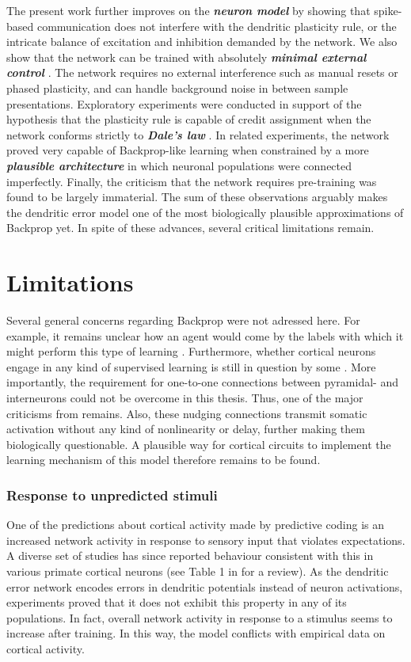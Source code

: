 The present work further improves on the \textit{\textbf{neuron model}} by showing that spike-based communication does
not interfere with the dendritic plasticity rule, or the intricate balance of excitation and inhibition demanded by the
network. We also show that the network can be trained with absolutely \textit{\textbf{minimal external control}}
\citep{Whittington2017}. The network requires no external interference such as manual resets or phased plasticity, and
can handle background noise in between sample presentations. Exploratory experiments were conducted in support of the
hypothesis that the plasticity rule is capable of credit assignment when the network conforms strictly to
\textit{\textbf{Dale's law}} \citep{Bartunov2018}. In related experiments, the network proved very capable of
Backprop-like learning when constrained by a more \textit{\textbf{plausible architecture}} \citep{Whittington2017} in
which neuronal populations were connected imperfectly. Finally, the criticism that the network requires pre-training
\citep{whittington2019theories} was found to be largely immaterial. The sum of these observations arguably makes the
dendritic error model one of the most biologically plausible approximations of Backprop yet. In spite of these advances,
several critical limitations remain.


\section{Limitations}

Several general concerns regarding Backprop were not adressed here. For example, it remains unclear how an agent would
come by the labels with which it might perform this type of learning \citep{Bengio2015}. Furthermore, whether cortical
neurons engage in any kind of supervised learning is still in question by some \citep{magee2020synaptic}. More
importantly, the requirement for one-to-one connections between pyramidal- and interneurons could not be overcome in
this thesis. Thus, one of the major criticisms from \citep{whittington2019theories} remains. Also, these nudging
connections transmit somatic activation without any kind of nonlinearity or delay, further making them biologically
questionable. A plausible way for cortical circuits to implement the learning mechanism of this model therefore remains
to be found.

\subsubsection*{Response to unpredicted stimuli}
One of the predictions about cortical activity made by predictive coding is an increased network activity in response to
sensory input that violates expectations. A diverse set of studies has since reported behaviour consistent with this in
various primate cortical neurons (see Table 1 in \citep{bastos2012canonical} for a review). As the dendritic error
network encodes errors in dendritic potentials instead of neuron activations, experiments proved that it does not
exhibit this property in any of its populations. In fact, overall network activity in response to a stimulus seems to
increase after training. In this way, the model conflicts with empirical data on cortical activity.

